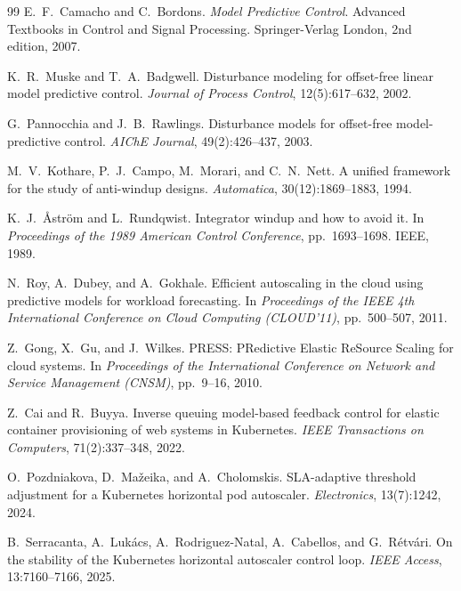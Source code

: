 \documentclass[journal]{IEEEtran}
\begin{document}
\begin{thebibliography}{99}
E.\ F.\ Camacho and C.\ Bordons.
\newblock \emph{Model Predictive Control}.
\newblock Advanced Textbooks in Control and Signal Processing.
  Springer-Verlag London, 2nd edition, 2007.

K.\ R.\ Muske and T.\ A.\ Badgwell.
\newblock Disturbance modeling for offset-free linear model predictive
  control.
\newblock \emph{Journal of Process Control}, 12(5):617--632, 2002.

G.\ Pannocchia and J.\ B.\ Rawlings.
\newblock Disturbance models for offset-free model-predictive control.
\newblock \emph{AIChE Journal}, 49(2):426--437, 2003.

M.\ V.\ Kothare, P.\ J.\ Campo, M.\ Morari, and C.\ N.\ Nett.
\newblock A unified framework for the study of anti-windup designs.
\newblock \emph{Automatica}, 30(12):1869--1883, 1994.

K.\ J.\ {\AA}str\"om and L.\ Rundqwist.
\newblock Integrator windup and how to avoid it.
\newblock In \emph{Proceedings of the 1989 American Control
  Conference}, pp.\ 1693--1698. IEEE, 1989.

N.\ Roy, A.\ Dubey, and A.\ Gokhale.
\newblock Efficient autoscaling in the cloud using predictive models
  for workload forecasting.
\newblock In \emph{Proceedings of the IEEE 4th International
  Conference on Cloud Computing (CLOUD'11)}, pp.\ 500--507, 2011.

Z.\ Gong, X.\ Gu, and J.\ Wilkes.
\newblock PRESS: PRedictive Elastic ReSource Scaling for cloud
  systems.
\newblock In \emph{Proceedings of the International Conference on
  Network and Service Management (CNSM)}, pp.\ 9--16, 2010.

Z.\ Cai and R.\ Buyya.
\newblock Inverse queuing model-based feedback control for elastic
  container provisioning of web systems in Kubernetes.
\newblock \emph{IEEE Transactions on Computers}, 71(2):337--348, 2022.

O.\ Pozdniakova, D.\ Ma\v{z}eika, and A.\ Cholomskis.
\newblock SLA-adaptive threshold adjustment for a Kubernetes
  horizontal pod autoscaler.
\newblock \emph{Electronics}, 13(7):1242, 2024.

B.\ Serracanta, A.\ Luk\'acs, A.\ Rodriguez-Natal, A.\ Cabellos, and
  G.\ R\'etv\'ari.
\newblock On the stability of the Kubernetes horizontal autoscaler
  control loop.
\newblock \emph{IEEE Access}, 13:7160--7166, 2025.


\end{thebibliography}
\end{document}
